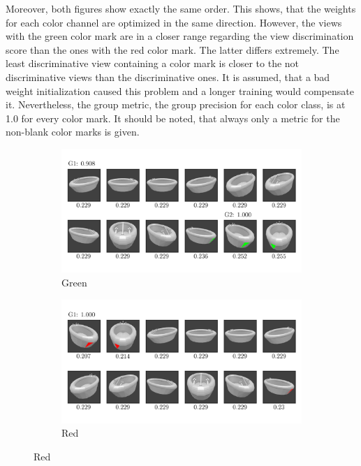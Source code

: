 Moreover, both figures show exactly the same order.
This shows, that the weights for each color channel are optimized in the same direction.
However, the views with the green color mark are in a closer range regarding the view discrimination score than the ones with the red color mark.
The latter differs extremely.
The least discriminative view containing a color mark is closer to the not discriminative views than the discriminative ones.
It is assumed, that a bad weight initialization caused this problem and a longer training would compensate it.
Nevertheless, the group metric, the group precision for each color class, is at 1.0 for every color mark.
It should be noted, that always only a metric for the non-blank color marks is given.
\begin{figure}
	\centering
	\begin{subfigure}{\textwidth}
		\includegraphics[trim=10 20 10 20, clip]{images/mn-sl-0-4-20/bathtub_0107_1_grouping.png}
		\caption{Green}
		\label{fig:grouping-0-4-green}
	\end{subfigure}
	\begin{subfigure}{\textwidth}
		\includegraphics[trim=10 20 10 20, clip]{images/mn-sl-0-4-20/bathtub_0107_2_grouping.png}
		\caption{Red}
		\label{fig:grouping-0-4-red}

\end{subfigure}
\end{figure}
